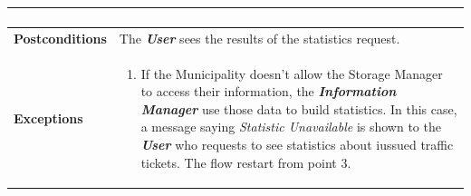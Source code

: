 \documentclass{report}
\begin{document}
\begin{tabularx}{\linewidth}{| l | X |}
{\begin{enumerate}
	\end{enumerate}}\\
	
	\hline
	\textbf{Postconditions} & The \textbf{\textit{User}} sees the results of the statistics request.\\
	
	\hline
	\textbf{Exceptions} & \parbox{0.7\textwidth}{ \begin{enumerate}
			\item If the Municipality doesn't allow the Storage Manager to access their information, the \textbf{\textit{Information Manager}} use those data to build statistics. In this case, a message saying \textit{Statistic Unavailable} is shown to the \textbf{\textit{User}} who requests to see statistics about iussued traffic tickets. The flow restart from point 3.  
		\end{enumerate}}\\
	
	\hline
	
\end{tabularx}
\newpage
\end{document}
